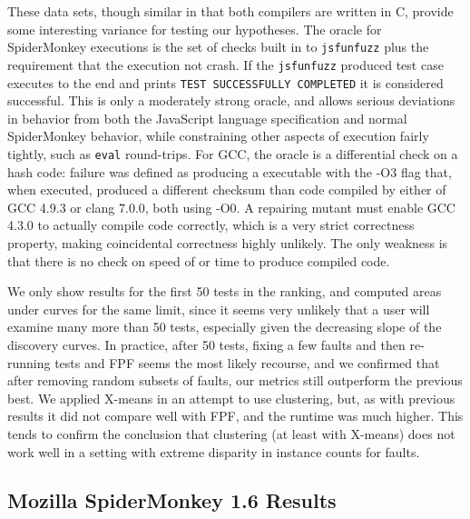 These data sets, though similar in that both compilers are written in C, provide some interesting variance for testing our hypotheses.  The oracle for SpiderMonkey executions is the set of checks built in to {\tt jsfunfuzz} plus the requirement that the execution not crash.   If the {\tt jsfunfuzz} produced test case executes to the end and prints {\tt TEST SUCCESSFULLY COMPLETED} it is considered successful.  This is only a moderately strong oracle, and allows serious deviations in behavior from both the JavaScript language specification and normal SpiderMonkey behavior, while constraining other aspects of execution fairly tightly, such as {\tt eval} round-trips.  For GCC, the oracle is a differential check on a hash code:  failure was defined as producing a executable with the -O3 flag that, when executed, produced a different checksum than code compiled by either of GCC 4.9.3 or clang 7.0.0, both using -O0.  A repairing mutant must enable GCC 4.3.0 to actually compile code correctly, which is a very strict correctness property, making coincidental correctness \cite{CCT} highly unlikely.  The only weakness is that there is no check on speed of or time to produce compiled code.

We only show results for the first 50 tests in the ranking, and computed areas under curves for the same limit, since it seems very unlikely that a user will examine many more than 50 tests, especially given the decreasing slope of the discovery curves.  In practice, after 50 tests, fixing a few faults and then re-running tests and FPF seems the most likely recourse, and we confirmed that after removing random subsets of faults, our metrics still outperform the previous best.  We applied X-means \cite{xmeans} in an attempt to use clustering, but, as with previous results \cite{PLDI13} it did not compare well with FPF, and the runtime was much higher.  This tends to confirm the conclusion \cite{PLDI13} that clustering (at least with X-means) does not work well in a setting with extreme disparity in instance counts for faults.  %

\subsection{Mozilla SpiderMonkey 1.6 Results}


